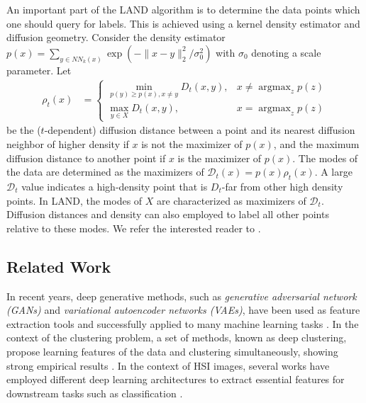 \documentclass{article}
\DeclareMathOperator*{\argmax}{argmax} %
\newcommand{\Dt}{\mathcal{D}_{t}}
\begin{document}
An important part of the LAND algorithm is to determine the data points which one should query for labels. This is achieved using a kernel density estimator and diffusion geometry.  Consider the density estimator $p(x)=\sum_{y\in NN_{k}(x)}\exp(-\|x-y\|_{2}^{2}/\sigma_{0}^{2})$
with $\sigma_0$ denoting a scale parameter. Let 
\begin{align}\label{eqn:rho}
\rho_{t}(x) &=
\begin{cases}
\displaystyle\min_{p(y)\ge p(x), x\neq y} D_{t}(x,y), &x\neq \displaystyle\argmax_{z}p(z) \\
\displaystyle\max_{y\in X} D_{t}(x,y), & x=\displaystyle\argmax_{z}p(z)
\end{cases}
\end{align} be the ($t$-dependent) diffusion distance between a point and its nearest diffusion neighbor of higher density if $x$ is not the maximizer of $p(x)$, and the maximum diffusion distance to another point if $x$ is the maximizer of $p(x)$.  The modes of the data are determined as the maximizers of $\Dt(x)=p(x)\rho_{t}(x)$.  A large $\Dt$ value indicates a high-density point that is $D_{t}$-far from other high density points. In LAND, the modes of $X$ are characterized as maximizers of $\Dt$. Diffusion distances and density can also employed to label all other points relative to these modes. We refer the interested reader to 
\cite{Maggioni2019_LAND}. 


\subsection{Related Work}
In recent years, deep generative methods, such as \emph{generative adversarial network (GANs)} and \emph{variational autoencoder networks (VAEs)}, have been used as feature extraction tools and successfully applied to many machine learning tasks \cite{ehsan2017infinite,makhzani2015adversarial}. In the context of the clustering problem, a set of methods, known as deep clustering, propose learning features of the data and clustering simultaneously, showing strong empirical results \cite{tian2014learning,song2013auto,xie2016unsupervised}. In the context of HSI images, several works have employed different deep learning architectures to extract essential features for downstream tasks such as classification \cite{chen2014deep,chen2016deep,li2017spectral,he2017multi,paoletti2019deep,zhang20191d}. 
\end{document}
